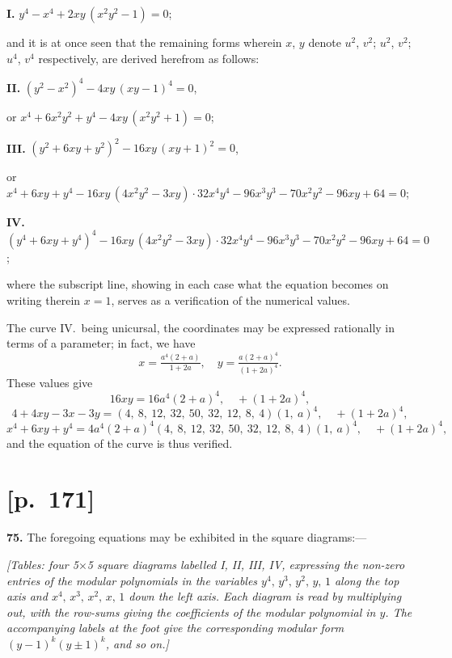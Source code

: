 \documentclass[11pt]{article}
\begin{document}
\medskip
\noindent\textbf{I.} \quad $y^4-x^4+2xy\,(x^2y^2-1)=0$;

and it is at once seen that the remaining forms wherein $x$, $y$ denote $u^2$, $v^2$; $u^2$, $v^2$;
$u^4$, $v^4$ respectively, are derived herefrom as follows:
\medskip

\noindent\textbf{II.} $(y^2-x^2)^4-4xy\,(xy-1)^4=0$,\par\quad or $x^4+6x^2y^2+y^4-4xy\,(x^2y^2+1)=0$;

\medskip
\noindent\textbf{III.} $(y^2+6xy+y^2)^2-16xy\,(xy+1)^2=0$,\par\quad or $x^4+6xy+y^4-16xy\,(4x^2y^2-3xy)\cdot 32x^4y^4-96x^3y^3-70x^2y^2-96xy+64=0$;

\medskip
\noindent\textbf{IV.} $(y^4+6xy+y^4)^4-16xy\,(4x^2y^2-3xy)\cdot 32x^4y^4-96x^3y^3-70x^2y^2-96xy+64=0$;

where the subscript line, showing in each case what the equation becomes on writing
therein $x=1$, serves as a verification of the numerical values.

The curve IV.\ being unicursal, the coordinates may be expressed rationally in
terms of a parameter; in fact, we have
\[
x=\tfrac{a^4(2+a)}{1+2a},\quad y=\tfrac{a(2+a)^4}{(1+2a)^4}.
\]
These values give
\[
16xy=16a^4(2+a)^4,\quad +(1+2a)^4,
\]
\[
4+4xy-3x-3y=(4,\ 8,\ 12,\ 32,\ 50,\ 32,\ 12,\ 8,\ 4)(1,\ a)^4,\quad +(1+2a)^4,
\]
\[
x^4+6xy+y^4=4a^4(2+a)^4(4,\ 8,\ 12,\ 32,\ 50,\ 32,\ 12,\ 8,\ 4)(1,\ a)^4,\quad +(1+2a)^4,
\]
and the equation of the curve is thus verified.

\section*{[p.~171]}

\noindent\textbf{75.} The foregoing equations may be exhibited in the square diagrams:---

\noindent\textit{[Tables: four 5$\times$5 square diagrams labelled I, II, III, IV, expressing the
non-zero entries of the modular polynomials in the variables $y^4,\,y^3,\,y^2,\,y,\,1$ along
the top axis and $x^4,\,x^3,\,x^2,\,x,\,1$ down the left axis. Each diagram is read by
multiplying out, with the row-sums giving the coefficients of the modular
polynomial in $y$. The accompanying labels at the foot give the
corresponding modular form $(y-1)^k(y\pm 1)^k$, and so on.]}
\end{document}
